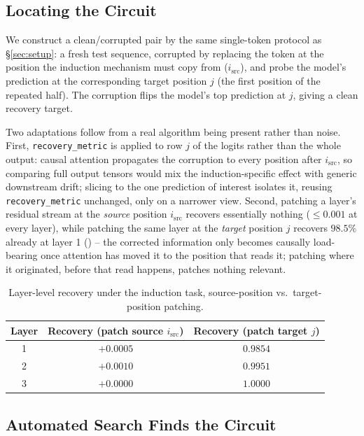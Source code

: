 \documentclass{article}
\begin{document}
\subsection{Locating the Circuit}

We construct a clean/corrupted pair by the same single-token protocol as \S\ref{sec:setup}: a
fresh test sequence, corrupted by replacing the token at the position the induction mechanism must
copy from ($i_{\text{src}}$), and probe the model's prediction at the corresponding target
position $j$ (the first position of the repeated half). The corruption flips the model's top
prediction at $j$, giving a clean recovery target.

Two adaptations follow from a real algorithm being present rather than noise. First,
\texttt{recovery\_metric} is applied to row $j$ of the logits rather than the whole output: causal
attention propagates the corruption to every position after $i_{\text{src}}$, so comparing full
output tensors would mix the induction-specific effect with generic downstream drift; slicing to
the one prediction of interest isolates it, reusing \texttt{recovery\_metric} unchanged, only on a
narrower view. Second, patching a layer's residual stream at the \emph{source} position
$i_{\text{src}}$ recovers essentially nothing ($\le 0.001$ at every layer), while patching the same
layer at the \emph{target} position $j$ recovers $98.5\%$ already at layer 1 ()
-- the corrected information only becomes causally load-bearing once attention has moved it to the
position that reads it; patching where it originated, before that read happens, patches nothing
relevant.

\begin{table}[H]
\centering
\caption{Layer-level recovery under the induction task, source-position vs.\ target-position
patching.}
\label{tab:induction-layers}
\begin{tabular}{c c c}
\toprule
\textbf{Layer} & \textbf{Recovery (patch source $i_{\text{src}}$)} & \textbf{Recovery (patch target $j$)} \\
\midrule
1 & $+0.0005$ & $0.9854$ \\
\rowcolor{rowgray}
2 & $+0.0010$ & $0.9951$ \\
3 & $+0.0000$ & $1.0000$ \\
\bottomrule
\end{tabular}
\end{table}

\subsection{Automated Search Finds the Circuit}
\end{document}

